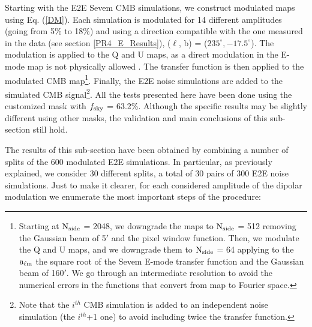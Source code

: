 Starting with the E2E Sevem CMB simulations, we construct modulated maps using Eq. (\ref{DM}). Each simulation is modulated for 14 different amplitudes (going from 5\% to 18\%) and using a direction compatible with the one measured in the data (see section \ref{PR4_E_Results}), ($\ell$, b) = ($235^{\circ}, -17.5^{\circ}$). The modulation is applied to the Q and U maps, as a direct modulation in the E-mode map is not physically allowed \cite{Kothari:2018cmt}. The transfer function is then applied to the modulated CMB map\footnote{Starting at $\rm N_{side}$ = 2048, we downgrade the maps to $\rm N_{side}$ = 512 removing the Gaussian beam of 5$'$ and the pixel window function. Then, we modulate the Q and U maps, and we downgrade them to $\rm N_{side}$ = 64 applying to the $\rm a_{\ell \rm m}$ the square root of the Sevem E-mode transfer function and the Gaussian beam of 160$'$. We go through an intermediate resolution to avoid the numerical errors in the functions that convert from map to Fourier space.}. Finally, the E2E noise simulations are added to the simulated CMB signal\footnote{Note that the $i^{th}$ CMB simulation is added to an independent noise simulation (the $i^{th}$+1 one) to avoid including twice the transfer function.}.
All the tests presented here have been done using the customized mask with $f_{\rm sky}$ = 63.2\%. Although the specific results may be slightly different using other masks, the validation and main conclusions of this sub-section still hold.

The results of this sub-section have been obtained by combining a number of splits of the 600 modulated E2E simulations. In particular, as previously explained, we consider 30 different splits, a total of 30 pairs of 300 E2E noise simulations. Just to make it clearer, for each considered amplitude of the dipolar modulation we enumerate the most important steps of the procedure:


